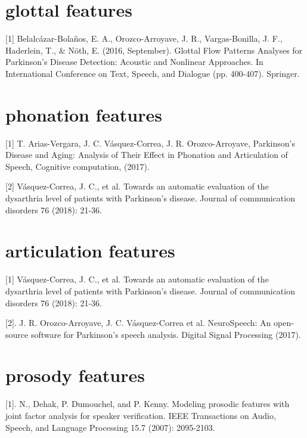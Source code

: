 \documentclass[letterpaper,10pt,english]{sphinxmanual}
\begin{document}
\section{glottal features}
\label{\detokenize{reference:glottal-features}}
{[}1{]} Belalcázar-Bolaños, E. A., Orozco-Arroyave, J. R., Vargas-Bonilla, J. F., Haderlein, T., \& Nöth, E. (2016, September). Glottal Flow Patterns Analyses for Parkinson’s Disease Detection: Acoustic and Nonlinear Approaches. In International Conference on Text, Speech, and Dialogue (pp. 400-407). Springer.


\section{phonation features}
\label{\detokenize{reference:phonation-features}}
{[}1{]} T. Arias-Vergara, J. C. Vásquez-Correa, J. R. Orozco-Arroyave, Parkinson's Disease and Aging: Analysis of Their Effect in Phonation and Articulation of Speech, Cognitive computation, (2017).

{[}2{]} Vásquez-Correa, J. C., et al. \sphinxquotedblleft{}Towards an automatic evaluation of the dysarthria level of patients with Parkinson's disease.\sphinxquotedblright{} Journal of communication disorders 76 (2018): 21-36.


\section{articulation features}
\label{\detokenize{reference:articulation-features}}
{[}1{]} Vásquez-Correa, J. C., et al. \sphinxquotedblleft{}Towards an automatic evaluation of the dysarthria level of patients with Parkinson's disease.\sphinxquotedblright{} Journal of communication disorders 76 (2018): 21-36.

{[}2{]}. J. R. Orozco-Arroyave, J. C. Vásquez-Correa et al. \sphinxquotedblleft{}NeuroSpeech: An open-source software for Parkinson's speech analysis.\sphinxquotedblright{} Digital Signal Processing (2017).


\section{prosody features}
\label{\detokenize{reference:prosody-features}}
{[}1{]}. N., Dehak, P. Dumouchel, and P. Kenny. \sphinxquotedblleft{}Modeling prosodic features with joint factor analysis for speaker verification.\sphinxquotedblright{} IEEE Transactions on Audio, Speech, and Language Processing 15.7 (2007): 2095-2103.
\end{document}
